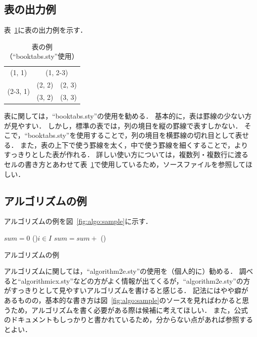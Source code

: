 \documentclass[lualatex]{ipsj}
\newcommand{\Fig}[1]{図~#1}
\newcommand{\Tab}[1]{表~#1}
\begin{document}
  \subsection{表の出力例}
  \Tab{\ref{tab:sample}}に表の出力例を示す．
  
    \begin{table}[t]
    \caption{表の例（``booktabs.sty''使用）}
    \label{tab:sample}
    \centering \small
      \begin{tabular}{ccc}
      \toprule
      (1, 1) & \multicolumn{2}{c}{(1, 2-3)} \\
      \cmidrule(r){1-1}\cmidrule(l){2-3}
      \multirow{2}{*}{(2-3, 1)} & (2, 2) & (2, 3) \\
      & (3, 2) & (3, 3) \\
      \bottomrule
      \end{tabular}
    \end{table}
  
  表に関しては，``booktabs.sty''の使用を勧める．
  基本的に，表は罫線の少ない方が見やすい．
  しかし，{\LaTeXe}標準の表では，列の境目を縦の罫線で表すしかない．
  そこで，``booktabs.sty''を使用することで，列の境目を横罫線の切れ目として表せる．
  また，表の上下で使う罫線を太く，中で使う罫線を細くすることで，よりすっきりとした表が作れる．
  詳しい使い方については，複数列・複数行に渡るセルの書き方とあわせて\Tab{\ref{tab:sample}}で使用しているため，ソースファイルを参照してほしい．
  
  \subsection{アルゴリズムの例}
  アルゴリズムの例を\Fig{\ref{fig:algo:sample}}に示す．
  
    \begin{algorithm}[t]
    \small
    \DontPrintSemicolon
    $sum = 0$\;
    \ForEach(){$i \in I$}{
      $sum = sum +$ 
    }
   	\BlankLine
   	\Proc(){}{
    }
    \caption{アルゴリズムの例}
    \label{fig:algo:sample}
    \end{algorithm}
  
  アルゴリズムに関しては，``algorithm2e.sty''の使用を（個人的に）勧める．
  調べると``algorithmicx.sty''などの方がよく情報が出てくるが，``algorithm2e.sty''の方がすっきりとして見やすいアルゴリズムを書けると感じる．
  記法にはやや癖があるものの，基本的な書き方は\Fig{\ref{fig:algo:sample}}のソースを見ればわかると思うため，アルゴリズムを書く必要がある際は候補に考えてほしい．
  また，公式のドキュメントもしっかりと書かれているため，分からない点があれば参照するとよい．
  
\end{document}
